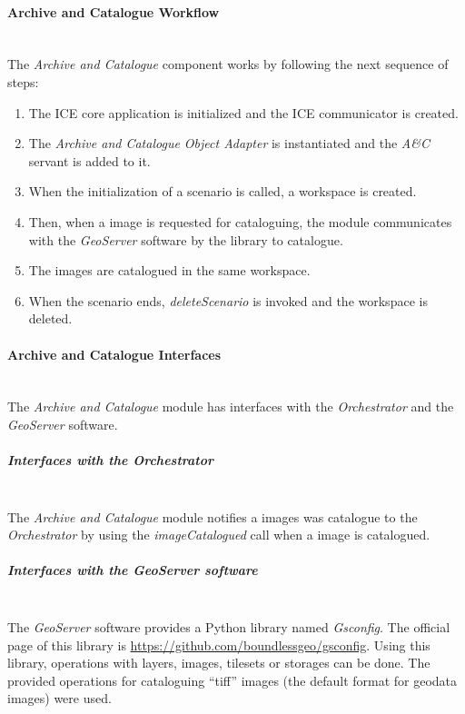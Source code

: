 \paragraph{Archive and Catalogue Workflow}~\\

The \emph{Archive and Catalogue} component works by following the next sequence of steps:
\begin{enumerate}
\item The ICE core application is initialized and the ICE communicator is
  created.
\item The \emph{Archive and Catalogue Object Adapter} is instantiated and the \emph{A\&C} servant is
  added to it.
\item When the initialization of a scenario is called, a workspace is created.
\item Then, when a image is requested for cataloguing, the module communicates with the
  \emph{GeoServer} software by the library to catalogue. 
\item The images are catalogued in the same workspace.
\item When the scenario ends, \emph{deleteScenario} is invoked and the
  workspace is deleted.
\end{enumerate}

\paragraph{Archive and Catalogue Interfaces}~\\

The \emph{Archive and Catalogue} module has interfaces with the
\emph{Orchestrator} and the \emph{GeoServer} software.

\subparagraph{Interfaces with the Orchestrator}~\\

The \emph{Archive and Catalogue} module notifies a images was catalogue to the \emph{Orchestrator} by
using the \emph{imageCatalogued} call when a
image is catalogued.

\subparagraph{Interfaces with the GeoServer software}~\\

The \emph{GeoServer} software provides a Python library named
\emph{Gsconfig}. The official page of this library is
\url{https://github.com/boundlessgeo/gsconfig}. Using this library, operations
with layers, images, tilesets or storages can be done. The provided operations
for cataloguing ``tiff'' images (the default format for geodata images) were
used.

